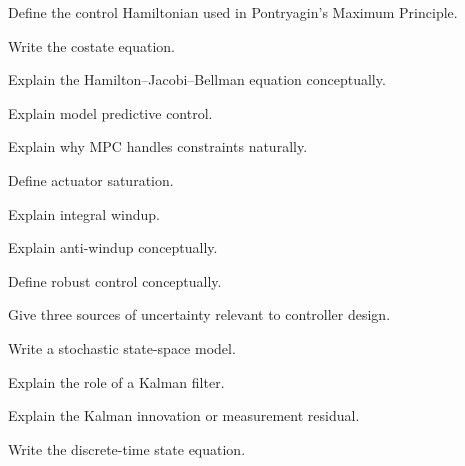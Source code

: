 \begin{exercise}[2]
Define the control Hamiltonian used in Pontryagin's Maximum Principle.
\end{exercise}

\begin{exercise}[3]
Write the costate equation.
\end{exercise}

\begin{exercise}[3]
Explain the Hamilton--Jacobi--Bellman equation conceptually.
\end{exercise}

\begin{exercise}[2]
Explain model predictive control.
\end{exercise}

\begin{exercise}[3]
Explain why MPC handles constraints naturally.
\end{exercise}

\begin{exercise}[2]
Define actuator saturation.
\end{exercise}

\begin{exercise}[3]
Explain integral windup.
\end{exercise}

\begin{exercise}[3]
Explain anti-windup conceptually.
\end{exercise}

\begin{exercise}[2]
Define robust control conceptually.
\end{exercise}

\begin{exercise}[3]
Give three sources of uncertainty relevant to controller design.
\end{exercise}

\begin{exercise}[2]
Write a stochastic state-space model.
\end{exercise}

\begin{exercise}[2]
Explain the role of a Kalman filter.
\end{exercise}

\begin{exercise}[3]
Explain the Kalman innovation or measurement residual.
\end{exercise}

\begin{exercise}[2]
Write the discrete-time state equation.
\end{exercise}

